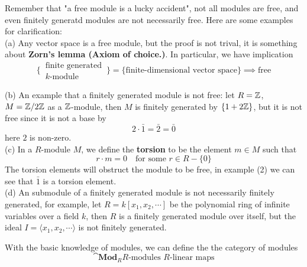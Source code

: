\begin{remark}
    Remember that "a free module is a lucky accident", not all modules are free, and even finitely generatd modules are not necessarily free. Here are some examples for clarification:\\

    (a) Any vector space is a free module, but the proof is not trival, it is something about \textbf{Zorn's lemma (Axiom of choice.)}. In particular, we have implication
    \[\{\, 
  \begin{array}{c}
    \text{finite generated} \\
    \text{$k$-module}
  \end{array}
\,\}
  = \{\text{finite-dimensional vector space}\} \implies \text{free}\]

    (b) An example that a finitely generated module is not free: let \(R = \mathbb{Z}\), \(M = \mathbb{Z}/2\mathbb{Z}\) as a \(\mathbb{Z}\)-module, then \(M\) is finitely generated by \(\{1+2\mathbb{Z}\}\), but it is not free since it is not a base by
    \[2 \cdot \bar{1} = \bar{2} = \bar{0}\]
    here \(2\) is non-zero.\\

    (c) In a \(R\)-module \(M\), we define the \textbf{torsion} to be the element \(m\in M\) such that 
    \[r \cdot m = 0 \quad \text{for some } r \in R-\{0\}\]
    The torsion elements will obstruct the module to be free, in example (2) we can see that \(\bar{1}\) is a torsion element.\\

    (d) An submodule of a finitely generated module is not necessarily finitely generated, for example, let \(R = k[x_1, x_2, \cdots]\) be the polynomial ring of infinite variables over a field \(k\), then \(R\) is a finitely generated module over itself, but the ideal \(I = \langle x_1, x_2, \cdots \rangle\) is not finitely generated.
\end{remark}

With the basic knowledge of modules, we can define the the category of modules
\[\cat{\mathbf{Mod}_R}{R\text{-modules } }{ R\text{-linear maps}}\]

